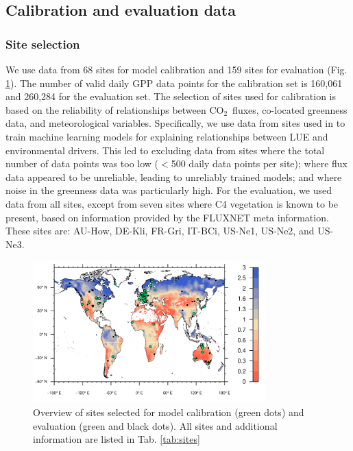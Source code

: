 \documentclass{myreport}
\newcommand{\coo}{CO$_2$}
\begin{document}
\subsection{Calibration and evaluation data}

\subsubsection{Site selection}
We use data from 68 sites for model calibration and 159 sites for evaluation (Fig. \ref{fig:map_sites}). The number of valid daily GPP data points for the calibration set is 160,061 and 260,284 for the evaluation set. The selection of sites used for calibration is based on the reliability of relationships between \coo\ fluxes, co-located greenness data, and meteorological variables. Specifically, we use data from sites used in \cite{stocker18newphyt} to train machine learning models for explaining relationships between LUE and environmental drivers. This led to excluding data from sites where the total number of data points was too low ($<$500 daily data points per site); where flux data appeared to be unreliable, leading to unreliably trained models; and where noise in the greenness data was particularly high. For the evaluation, we used data from all sites, except from seven sites where C4 vegetation is known to be present, based on information provided by the FLUXNET meta information. These sites are: AU-How, DE-Kli, FR-Gri, IT-BCi, US-Ne1, US-Ne2, and US-Ne3.

\begin{figure}[!ht]
    \centering
    \includegraphics[width=0.8\textwidth]{fig/map_sites.pdf}
    \caption{Overview of sites selected for model calibration (green dots) and evaluation (green and black dots). All sites and additional information are listed in Tab. \ref{tab:sites}}
    \label{fig:map_sites}
\end{figure}
\end{document}
